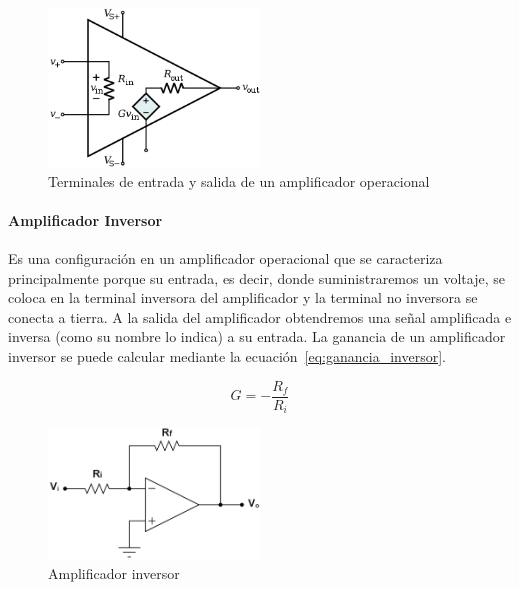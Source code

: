             \begin{figure}[H]
                \centering
                \includegraphics[width=0.5\textwidth]{img/Desarrollo/Amplificador_Operacional.png}
                \caption[Terminales de entrada y salida de un amplificador operacional]{Terminales de entrada y salida de un amplificador operacional\footnotemark}
                \label{fig:Amplificador_Operacional}
            \end{figure}

            \paragraph{Amplificador Inversor}
                Es una configuración en un amplificador operacional que se caracteriza principalmente porque su entrada, es decir, donde suministraremos un voltaje, se coloca en la terminal inversora del amplificador y la terminal no inversora se conecta a tierra. A la salida del amplificador obtendremos una señal amplificada e inversa (como su nombre lo indica) a su entrada. La ganancia de un amplificador inversor se puede calcular mediante la ecuación~\ref{eq:ganancia_inversor}.

                \begin{equation}
                    \label{eq:ganancia_inversor}
                    G = -\frac{R_f}{R_i}
                \end{equation}

                \begin{figure}[H]
                    \centering
                    \includegraphics[width=0.5\textwidth]{img/Desarrollo/Amplificador_Inversor.png}
                    \caption[Amplificador inversor]{Amplificador inversor\footnotemark}
                    \label{fig:Amplificador_Inversor}
                \end{figure}

